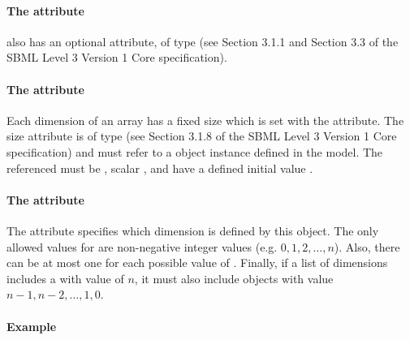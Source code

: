 \paragraph{The  attribute}

\Dimension also has an optional  attribute, of type   (see Section 3.1.1 and Section 3.3 of the SBML Level 3 Version 1 Core specification).

\paragraph{The  attribute}

Each dimension of an array has a fixed size which is set with the  attribute.   The size attribute is of type   (see Section 3.1.8 of the SBML Level 3 Version 1 Core specification) and must refer to a \Parameter object instance defined in the model.   The \Parameter referenced must be , scalar , and have a defined initial value .


\paragraph{The  attribute}

The  attribute specifies which dimension is defined by this \Dimension object.
The only allowed values for  are non-negative integer values (e.g. $0,1,2,\dots,n$).   Also, there can be at most one \Dimension for each possible value of .
Finally, if a list of dimensions includes a \Dimension with  value of $n$, it must also
include \Dimension objects with value $n-1, n-2, \dots , 1, 0$.

\paragraph{Example}

